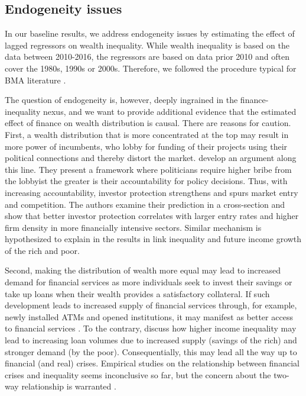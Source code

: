 \begin{refsection}
\subsection{Endogeneity issues}
In our baseline results, we address endogeneity issues by estimating the effect of lagged regressors on wealth inequality. While wealth inequality is based on the data between 2010-2016, the regressors are based on data prior 2010 and often cover the 1980s, 1990s or 2000s. Therefore, we followed the procedure typical for \ac{BMA} literature \parencite{christofides,feldkircherjimf,hasan2016}.  

The question of endogeneity is, however, deeply ingrained in the finance-inequality nexus, and we want to provide additional evidence that the estimated effect of finance on wealth distribution is causal. There are reasons for caution. First, a wealth distribution that is more concentrated at the top may result in more power of incumbents, who lobby for funding of their projects using their political connections and thereby distort the market. \textcite{perotti2007investor} develop an argument along this line. They present a framework where politicians require higher bribe from the lobbyist the greater is their accountability for policy decisions. Thus, with increasing accountability, investor protection strengthens and spurs market entry and competition. The authors examine their prediction in a cross-section
and show that better investor protection correlates with larger entry rates and
higher firm density in more financially intensive sectors. Similar mechanism is hypothesized to explain in the results in \textcite{milanovicvan2018inequality} link inequality and future income growth of the rich and poor.

Second, making the distribution of wealth more equal may lead to increased demand for financial services as more individuals seek to invest their savings or take up loans when their wealth provides a satisfactory collateral. If such development leads to increased supply of financial services through, for example, newly installed ATMs and opened institutions, it may manifest as better access to financial services \parencite{beck2007finance}. To the contrary, \textcite{kumhof2015inequality} discuss how higher income inequality may lead to increasing loan volumes due to increased supply (savings of the rich) and stronger demand (by the poor). Consequentially, this may lead all the way up to financial (and real) crises. Empirical studies on the relationship between financial crises and inequality seems inconclusive so far, but the concern about the two-way relationship is warranted \parencite{de2017finance, bazillier2017circular}.


\end{refsection}
